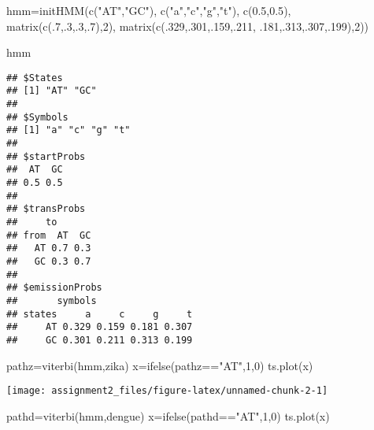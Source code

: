 \documentclass[
]{article}
\newenvironment{Shaded}{\begin{snugshade}}{\end{snugshade}}
\newcommand{\DecValTok}[1]{\textcolor[rgb]{0.00,0.00,0.81}{#1}}
\newcommand{\FloatTok}[1]{\textcolor[rgb]{0.00,0.00,0.81}{#1}}
\newcommand{\FunctionTok}[1]{\textcolor[rgb]{0.00,0.00,0.00}{#1}}
\newcommand{\NormalTok}[1]{#1}
\newcommand{\OtherTok}[1]{\textcolor[rgb]{0.56,0.35,0.01}{#1}}
\newcommand{\SpecialCharTok}[1]{\textcolor[rgb]{0.00,0.00,0.00}{#1}}
\newcommand{\StringTok}[1]{\textcolor[rgb]{0.31,0.60,0.02}{#1}}
\begin{document}
\begin{Shaded}
\begin{Highlighting}[]
\NormalTok{hmm}\OtherTok{=}\FunctionTok{initHMM}\NormalTok{(}\FunctionTok{c}\NormalTok{(}\StringTok{"AT"}\NormalTok{,}\StringTok{"GC"}\NormalTok{), }\FunctionTok{c}\NormalTok{(}\StringTok{"a"}\NormalTok{,}\StringTok{"c"}\NormalTok{,}\StringTok{"g"}\NormalTok{,}\StringTok{"t"}\NormalTok{), }\FunctionTok{c}\NormalTok{(}\FloatTok{0.5}\NormalTok{,}\FloatTok{0.5}\NormalTok{),}
\FunctionTok{matrix}\NormalTok{(}\FunctionTok{c}\NormalTok{(.}\DecValTok{7}\NormalTok{,.}\DecValTok{3}\NormalTok{,.}\DecValTok{3}\NormalTok{,.}\DecValTok{7}\NormalTok{),}\DecValTok{2}\NormalTok{), }\FunctionTok{matrix}\NormalTok{(}\FunctionTok{c}\NormalTok{(.}\DecValTok{329}\NormalTok{,.}\DecValTok{301}\NormalTok{,.}\DecValTok{159}\NormalTok{,.}\DecValTok{211}\NormalTok{,}
\NormalTok{.}\DecValTok{181}\NormalTok{,.}\DecValTok{313}\NormalTok{,.}\DecValTok{307}\NormalTok{,.}\DecValTok{199}\NormalTok{),}\DecValTok{2}\NormalTok{))}

\NormalTok{hmm}
\end{Highlighting}
\end{Shaded}

\begin{verbatim}
## $States
## [1] "AT" "GC"
## 
## $Symbols
## [1] "a" "c" "g" "t"
## 
## $startProbs
##  AT  GC 
## 0.5 0.5 
## 
## $transProbs
##     to
## from  AT  GC
##   AT 0.7 0.3
##   GC 0.3 0.7
## 
## $emissionProbs
##       symbols
## states     a     c     g     t
##     AT 0.329 0.159 0.181 0.307
##     GC 0.301 0.211 0.313 0.199
\end{verbatim}

\begin{Shaded}
\begin{Highlighting}[]
\NormalTok{pathz}\OtherTok{=}\FunctionTok{viterbi}\NormalTok{(hmm,zika)}
\NormalTok{x}\OtherTok{=}\FunctionTok{ifelse}\NormalTok{(pathz}\SpecialCharTok{==}\StringTok{"AT"}\NormalTok{,}\DecValTok{1}\NormalTok{,}\DecValTok{0}\NormalTok{)}
\FunctionTok{ts.plot}\NormalTok{(x)}
\end{Highlighting}
\end{Shaded}

\begin{center}\texttt{[image: assignment2\_files/figure-latex/unnamed-chunk-2-1]} \end{center}

\begin{Shaded}
\begin{Highlighting}[]
\NormalTok{pathd}\OtherTok{=}\FunctionTok{viterbi}\NormalTok{(hmm,dengue)}
\NormalTok{x}\OtherTok{=}\FunctionTok{ifelse}\NormalTok{(pathd}\SpecialCharTok{==}\StringTok{"AT"}\NormalTok{,}\DecValTok{1}\NormalTok{,}\DecValTok{0}\NormalTok{)}
\FunctionTok{ts.plot}\NormalTok{(x)}
\end{Highlighting}
\end{Shaded}
\end{document}
